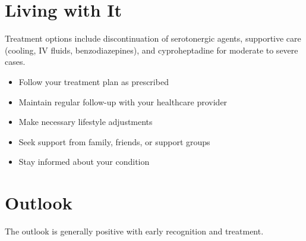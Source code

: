 \section{Living with It}
Treatment options include discontinuation of serotonergic agents, supportive care (cooling, IV fluids, benzodiazepines), and cyproheptadine for moderate to severe cases.

\begin{itemize}[noitemsep]
  \item Follow your treatment plan as prescribed
  \item Maintain regular follow-up with your healthcare provider
  \item Make necessary lifestyle adjustments
  \item Seek support from family, friends, or support groups
  \item Stay informed about your condition
\end{itemize}
\section{Outlook}
The outlook is generally positive with early recognition and treatment.
